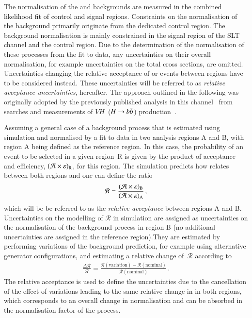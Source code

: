 The normalisation of the \ZHF and \ttbar backgrounds are measured in
the combined likelihood fit of control and signal regions. Constraints
on the normalisation of the \ZHF background primarily originate from
the dedicated control region. The \ttbar background normalisation is
mainly constrained in the signal region of the \lephad SLT channel and
the \ZHF control region. Due to the determination of the normalisation
of these processes from the fit to data, any uncertainties on their
overall normalisation, for example uncertainties on the total cross
sections, are omitted. Uncertainties changing the relative acceptance
of \ZHF or \ttbar events between regions have to be considered
instead. These uncertainties will be referred to as \emph{relative
  acceptance uncertainties}, hereafter. The approach outlined in the
following was originally adopted by the previously published analysis
in this channel~\cite{HIGG-2016-16-witherratum} from searches and
measurements of $VH$~($H\to b\bar{b}$)
production~\cite{HIGG-2016-29,HIGG-2018-04,HIGG-2018-51}.

Assuming a general case of a background process that is estimated
using simulation and normalised by a fit to data in two analysis
regions A and B, with region A being defined as the reference
region. In this case, the probability of an event to be selected in a
given region~R is given by the product of acceptance and efficiency,
$(\mathcal{A} \times \varepsilon)_{\text{R}}$, for this region. The simulation predicts
how \AccTimesEff relates between both regions and one can define the
ratio
\begin{align*}
  \mathcal{R} = \frac{(\mathcal{A} \times \varepsilon)_{\text{B}}}{(\mathcal{A} \times \varepsilon)_{\text{A}}} \,\text{,}
\end{align*}
which will be be referred to as the \emph{relative acceptance} between
regions A and B. Uncertainties on the modelling of $\mathcal{R}$ in
simulation are assigned as uncertainties on the normalisation of the
background process in region B (no
additional uncertainties are assigned in the reference region).They
are estimated by performing variations of the background prediction,
for example using alternative generator configurations, and estimating
a relative change of~$\mathcal{R}$ according to
\begin{align}
  \frac{\Delta \mathcal{R}}{\mathcal{R}} = \frac{\mathcal{R}(\text{variation}) - \mathcal{R}(\text{nominal})}{\mathcal{R}(\text{nominal})} \,\text{.}
  \label{eq:relative_acceptance_uncertainty}
\end{align}
The relative acceptance is used to define the uncertainties due to the
cancellation of the effect of variations leading to the same relative
change in \AccTimesEff in both regions, which corresponds to an
overall change in normalisation and can be absorbed in the
normalisation factor of the process.


